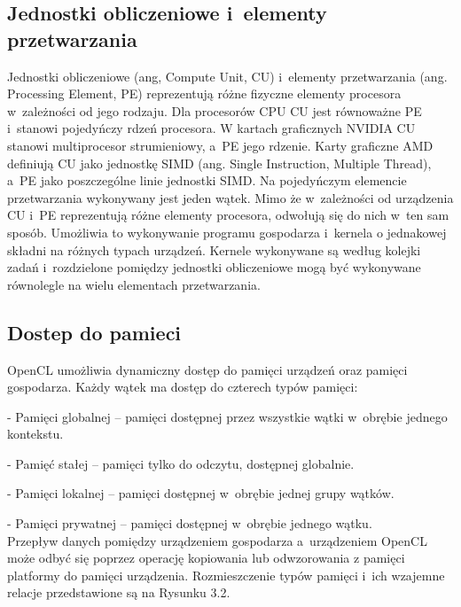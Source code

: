 \subsection{Jednostki obliczeniowe i~elementy przetwarzania}\label{sec:OpenC3L}

Jednostki obliczeniowe (ang, Compute Unit, CU) i~elementy przetwarzania (ang. Processing Element, PE) reprezentują różne fizyczne elementy procesora w~zależności od jego rodzaju. Dla procesorów CPU CU jest równoważne PE i~stanowi pojedyńczy rdzeń procesora. W kartach graficznych NVIDIA CU stanowi multiprocesor strumieniowy, a~PE jego rdzenie. Karty graficzne AMD definiują CU jako jednostkę SIMD (ang. Single Instruction, Multiple Thread), a~PE jako poszczególne linie jednostki SIMD. Na pojedyńczym elemencie przetwarzania wykonywany jest jeden wątek. Mimo że w~zależności od urządzenia CU i~PE reprezentują różne elementy procesora, odwołują się do nich w~ten sam sposób. Umożliwia to wykonywanie programu gospodarza i~kernela o jednakowej składni na różnych typach urządzeń. Kernele wykonywane są według kolejki zadań i~rozdzielone pomiędzy jednostki obliczeniowe mogą być wykonywane równolegle na wielu elementach przetwarzania.

\subsection{Dostep do pamieci}\label{sec:OpenC6L}

OpenCL umożliwia dynamiczny dostęp do pamięci urządzeń oraz pamięci gospodarza. Każdy wątek ma dostęp do czterech typów pamięci:

- Pamięci globalnej – pamięci dostępnej przez wszystkie wątki w~obrębie jednego kontekstu.

- Pamięć stałej – pamięci tylko do odczytu, dostępnej globalnie.

- Pamięci lokalnej – pamięci dostępnej w~obrębie jednej grupy wątków.

- Pamięci prywatnej – pamięci dostępnej w~obrębie jednego wątku.\\

Przepływ danych pomiędzy urządzeniem gospodarza a~urządzeniem OpenCL może odbyć się poprzez operację kopiowania  lub odwzorowania z pamięci platformy do pamięci urządzenia. Rozmieszczenie typów pamięci i~ich wzajemne relacje przedstawione są na Rysunku 3.2.

